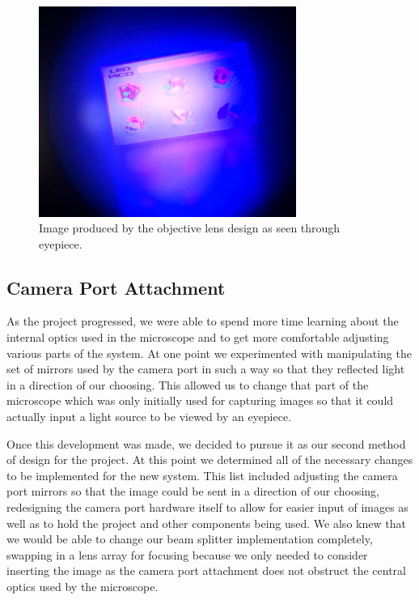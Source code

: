 \documentclass[12pt,a4paper]{article}
\begin{document}
\begin{appendices}
\begin{figure}[h]
	\centering
	\includegraphics[width = 0.75\textwidth]{pics/objective_lens_output.jpg}
	\caption[Objective Lens Output]{\centering Image produced by the objective lens design as seen through eyepiece.}
	\label{OLO}
\end{figure}





\subsection{Camera Port Attachment}
As the project progressed, we were able to spend more time learning about the internal optics used in the microscope and to get more comfortable adjusting various parts of the system.  At one point we experimented with manipulating the set of mirrors used by the camera port in such a way so that they reflected light in a direction of our choosing.  This allowed us to change that part of the microscope which was only initially used for capturing images so that it could actually input a light source to be viewed by an eyepiece.

Once this development was made, we decided to pursue it as our second method of design for the project.  At this point we determined all of the necessary changes to be implemented for the new system.  This list included adjusting the camera port mirrors so that the image could be sent in a direction of our choosing, redesigning the camera port hardware itself to allow for easier input of images as well as to hold the project and other components being used.  We also knew that we would be able to change our beam splitter implementation completely, swapping in a lens array for focusing because we only needed to consider inserting the image as the camera port attachment does not obstruct the central optics used by the microscope.


\end{appendices}
\end{document}
